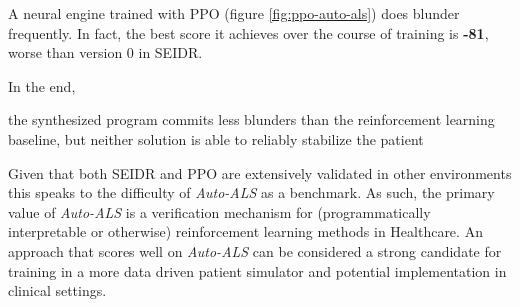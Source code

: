 A neural engine trained with PPO (figure \ref{fig:ppo-auto-als}) does blunder frequently.
In fact, the best score it achieves over the course of training is \textbf{-81}, worse than version 0 in SEIDR.

In the end,

\begin{highlight}
the synthesized program commits less blunders than the reinforcement learning baseline, but neither solution is able to reliably stabilize the patient
\end{highlight}

Given that both SEIDR and PPO are extensively validated in other environments this speaks to the difficulty of \emph{Auto-ALS} as a benchmark.
As such, the primary value of \emph{Auto-ALS} is a verification mechanism for (programmatically interpretable or otherwise) reinforcement learning methods in Healthcare.
An approach that scores well on \emph{Auto-ALS} can be considered a strong candidate for training in a more data driven patient simulator and potential implementation in clinical settings.
